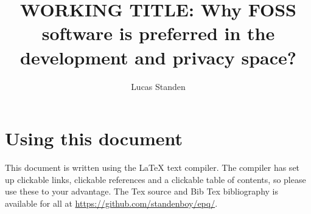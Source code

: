 \documentclass[a4paper,12pt]{article}
\author{Lucas Standen}
\title{WORKING TITLE: Why FOSS software is preferred in the 
development and privacy space?}
\begin{document}
\maketitle

\newpage

\section{Using this document}
This document is written using the {\LaTeX} text compiler. The compiler has set up clickable links,
clickable references and a clickable table of contents, so please use these to your advantage. 
The Tex source and Bib Tex bibliography is available for all at 
\url{https://github.com/standenboy/epq/}.

\tableofcontents
\newpage

\setlength{\parskip}{1em}
\end{document}
